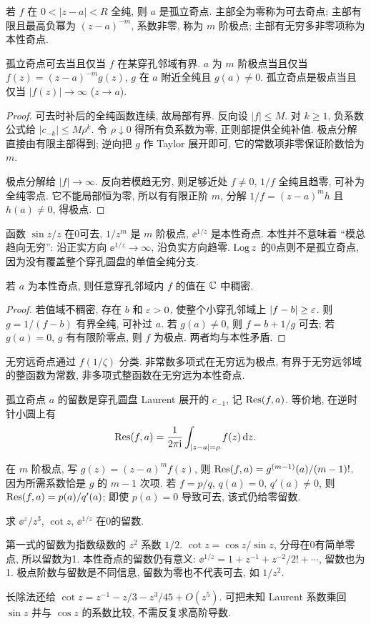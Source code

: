 \begin{definition}
若 $f$ 在 $0<|z-a|<R$ 全纯, 则 $a$ 是孤立奇点. 主部全为零称为可去奇点; 主部有限且最高负幂为 $(z-a)^{-m}$, 系数非零, 称为 $m$ 阶极点; 主部有无穷多非零项称为本性奇点.
\end{definition}
\begin{theorem}\label{thm:removable}
孤立奇点可去当且仅当 $f$ 在某穿孔邻域有界. $a$ 为 $m$ 阶极点当且仅当 $f(z)=(z-a)^{-m}g(z)$, $g$ 在 $a$ 附近全纯且 $g(a)\ne0$. 孤立奇点是极点当且仅当 $|f(z)|\to\infty$ ($z\to a$).
\end{theorem}
\begin{proof}
可去时补后的全纯函数连续, 故局部有界. 反向设 $|f|\le M$. 对 $k\ge1$, 负系数公式给 $|c_{-k}|\le M\rho^k$. 令 $\rho\downarrow0$ 得所有负系数为零, 正则部提供全纯补值. 极点分解直接由有限主部得到; 逆向把 $g$ 作 Taylor 展开即可, 它的常数项非零保证阶数恰为 $m$.

极点分解给 $|f|\to\infty$. 反向若模趋无穷, 则足够近处 $f\ne0$, $1/f$ 全纯且趋零, 可补为全纯零点. 它不能局部恒为零, 所以有有限正阶 $m$, 分解 $1/f=(z-a)^mh$ 且 $h(a)\ne0$, 得极点.
\end{proof}
函数 $\sin z/z$ 在0可去, $1/z^m$ 是 $m$ 阶极点, $\ee^{1/z}$ 是本性奇点. 本性并不意味着 ``模总趋向无穷'': 沿正实方向 $\ee^{1/z}\to\infty$, 沿负实方向趋零. $\operatorname{Log} z$ 的0点则不是孤立奇点, 因为没有覆盖整个穿孔圆盘的单值全纯分支.
\begin{theorem}
若 $a$ 为本性奇点, 则任意穿孔邻域内 $f$ 的值在 $\mathbb C$ 中稠密.
\end{theorem}
\begin{proof}
若值域不稠密, 存在 $b$ 和 $\varepsilon>0$, 使整个小穿孔邻域上 $|f-b|\ge\varepsilon$. 则 $g=1/(f-b)$ 有界全纯, 可补过 $a$. 若 $g(a)\ne0$, 则 $f=b+1/g$ 可去; 若 $g(a)=0$, $g$ 有有限阶零点, 则 $f$ 为极点. 两者均与本性矛盾.
\end{proof}
无穷远奇点通过 $f(1/\zeta)$ 分类. 非常数多项式在无穷远为极点, 有界于无穷远邻域的整函数为常数, 非多项式整函数在无穷远为本性奇点.

\begin{definition}
孤立奇点 $a$ 的留数是穿孔圆盘 Laurent 展开的 $c_{-1}$, 记 $\operatorname{Res}(f,a)$. 等价地, 在逆时针小圆上有
\[
\operatorname{Res}(f,a)=\frac1{2\pi\mathrm i}\int_{|z-a|=\rho}f(z)\,\mathrm d z.
\]
\end{definition}
在 $m$ 阶极点, 写 $g(z)=(z-a)^mf(z)$, 则 $\operatorname{Res}(f,a)=g^{(m-1)}(a)/(m-1)!$. 因为所需系数恰是 $g$ 的 $m-1$ 次项. 若 $f=p/q$, $q(a)=0$, $q'(a)\ne0$, 则 $\operatorname{Res}(f,a)=p(a)/q'(a)$; 即使 $p(a)=0$ 导致可去, 该式仍给零留数.
\begin{example}
求 $\ee^z/z^3$, $\cot z$, $\ee^{1/z}$ 在0的留数.
\end{example}
\begin{solution}
第一式的留数为指数级数的 $z^2$ 系数 $1/2$. $\cot z=\cos z/\sin z$, 分母在0有简单零点, 所以留数为1. 本性奇点的留数仍有意义: $\ee^{1/z}=1+z^{-1}+z^{-2}/2!+\cdots$, 留数也为1. 极点阶数与留数是不同信息, 留数为零也不代表可去, 如 $1/z^2$.
\end{solution}
长除法还给 $\cot z=z^{-1}-z/3-z^3/45+O(z^5)$. 可把未知 Laurent 系数乘回 $\sin z$ 并与 $\cos z$ 的系数比较, 不需反复求高阶导数.

